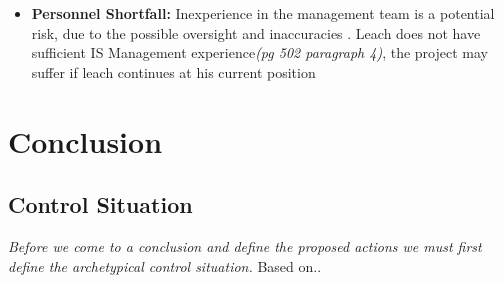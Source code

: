 \documentclass[12pt]{article} %
\begin{document}
	
	
	
	
	
	
	
	
	\begin{itemize} 
		\item \textbf{Personnel Shortfall:} Inexperience in the management team is a potential risk, due to the possible oversight and inaccuracies . Leach does not have sufficient IS Management experience\textit{(pg 502 paragraph 4)}, the project may suffer if leach continues
		at his current position 
		
	\end{itemize}
	
	\section{Conclusion} %
	
	\subsection {Control Situation}
	
	\textit{Before we come to a conclusion and define the proposed actions we must first define the archetypical control situation. } Based on.. \\ %
	
	
	\newpage
	
\end{document}
